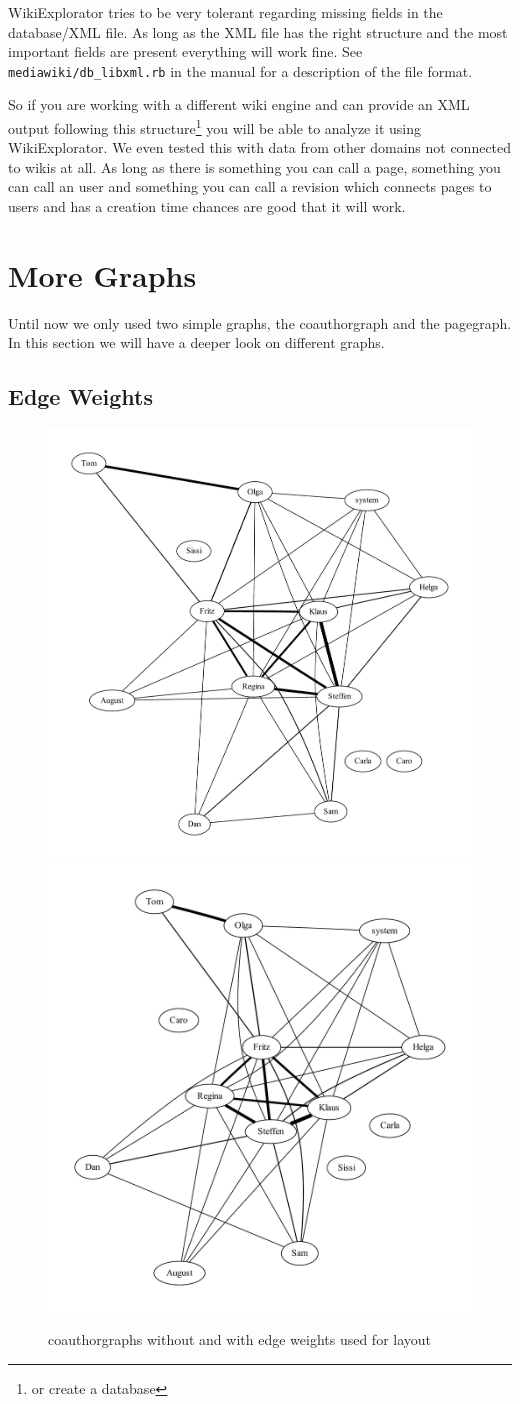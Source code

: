 \documentclass[a4paper]{scrartcl}
\newcommand{\rdoc}[1]{\texttt{\color{help}#1}}
\begin{document}
\bigskip

WikiExplorator tries to be very tolerant regarding missing fields in
the database/XML file. As long as the XML file has the right structure
and the most important fields are present everything will work
fine. See \rdoc{mediawiki/db\_libxml.rb} in the manual for a
description of the file format.

So if you are working with a different wiki engine and can provide an
XML output following this structure\footnote{or create a database} you
will be able to analyze it using WikiExplorator. We even tested this
with data from other domains not connected to wikis at all. As long as
there is something you can call a page, something you can call an user
and something you can call a revision which connects pages to users
and has a creation time chances are good that it will work.

\clearpage
\section{More Graphs}
\label{sec:moregraphs}

Until now we only used two simple graphs, the coauthorgraph and the
pagegraph. In this section we will have a deeper look on different
graphs. 

\subsection{Edge Weights}
\label{sec:edgeweights}

\begin{figure}
  \centering
  \includegraphics[width=.5\linewidth]{gv_ca-noweights}\hfill
  \includegraphics[width=.45\linewidth]{gv_ca-weights}
  \caption{coauthorgraphs without and with edge weights used for
    layout}
  \label{fig:gv_ca-weights}
\end{figure}
\end{document}
